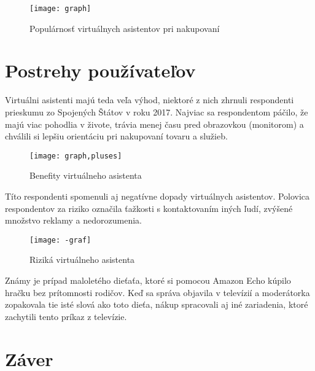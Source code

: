 \documentclass[10pt,twoside,slovak,coursepaper]{article}
\begin{document}
\begin{figure}[H]
 \centering
 \texttt{[image: graph]}
\caption {Populárnosť virtuálnych asistentov pri nakupovaní \cite{iKinsella}}
\end{figure}

\section{Postrehy používateľov}

Virtuálni asistenti majú teda veľa výhod, niektoré z nich zhrnuli respondenti prieskumu zo Spojených Štátov v roku 2017. Najviac sa respondentom páčilo, že majú viac pohodlia v živote, trávia menej času pred obrazovkou (monitorom) a chválili si lepšiu orientáciu pri nakupovaní tovaru a služieb.\cite{Nae}

\begin{figure}[H]
\centering
\texttt{[image: graph,pluses]}
\caption{Benefity virtuálneho asistenta\cite{iNae}}
\end{figure}

Títo respondenti spomenuli aj negatívne dopady virtuálnych asistentov. Polovica respondentov za riziko označila ťažkosti s kontaktovaním iných ľudí, zvýšené množstvo reklamy a nedorozumenia.\cite{Nae}

\begin{figure}[H]
\centering
\texttt{[image: -graf]}
\caption{Riziká virtuálneho asistenta \cite{iNae}}
\end{figure}

Známy je prípad maloletého dieťaťa, ktoré si pomocou Amazon Echo kúpilo hračku bez prítomnosti rodičov. Keď sa správa objavila v televízií a moderátorka zopakovala tie isté slová ako toto dieťa, nákup spracovali aj iné zariadenia, ktoré zachytili tento príkaz z televízie.



\section{Záver}




\end{document}
